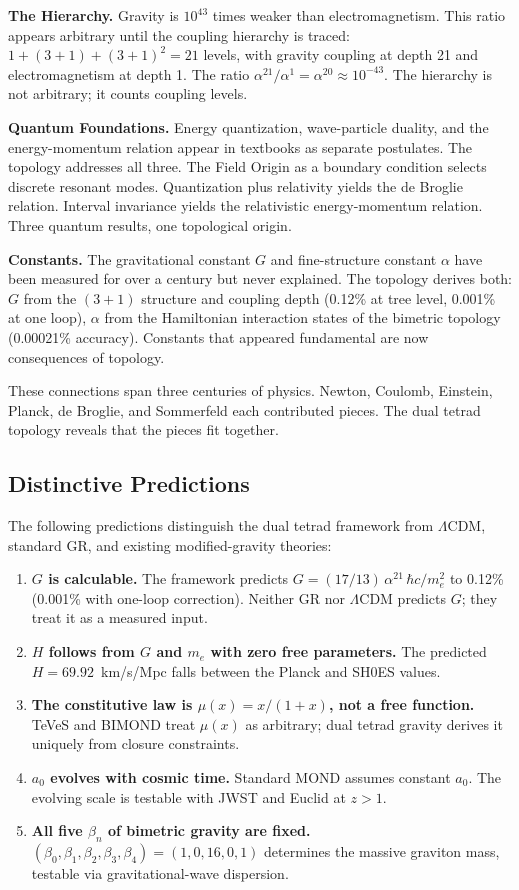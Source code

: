 \documentclass[aps,prd,preprint,superscriptaddress,showpacs,preprintnumbers,amsmath,amssymb,nofootinbib]{revtex4-2}
\begin{document}
\textbf{The Hierarchy.} Gravity is $10^{43}$ times weaker than electromagnetism. This ratio appears arbitrary until the coupling hierarchy is traced: $1 + (3+1) + (3+1)^2 = 21$ levels, with gravity coupling at depth 21 and electromagnetism at depth 1. The ratio $\alpha^{21}/\alpha^{1} = \alpha^{20} \approx 10^{-43}$. The hierarchy is not arbitrary; it counts coupling levels.

\textbf{Quantum Foundations.} Energy quantization, wave-particle duality, and the energy-momentum relation appear in textbooks as separate postulates. The topology addresses all three. The Field Origin as a boundary condition selects discrete resonant modes. Quantization plus relativity yields the de Broglie relation. Interval invariance yields the relativistic energy-momentum relation. Three quantum results, one topological origin.

\textbf{Constants.} The gravitational constant $G$ and fine-structure constant $\alpha$ have been measured for over a century but never explained. The topology derives both: $G$ from the $(3+1)$ structure and coupling depth (0.12\% at tree level, 0.001\% at one loop), $\alpha$ from the Hamiltonian interaction states of the bimetric topology (0.00021\% accuracy). Constants that appeared fundamental are now consequences of topology.

These connections span three centuries of physics. Newton, Coulomb, Einstein, Planck, de Broglie, and Sommerfeld each contributed pieces. The dual tetrad topology reveals that the pieces fit together.

\subsection{Distinctive Predictions}
\label{subsec:predictions}

The following predictions distinguish the dual tetrad framework from $\Lambda$CDM, standard GR, and existing modified-gravity theories:
\begin{enumerate}[leftmargin=2em]
\item \textbf{$G$ is calculable.} The framework predicts $G = (17/13)\,\alpha^{21}\,\hbar c/m_e^2$ to 0.12\% (0.001\% with one-loop correction). Neither GR nor $\Lambda$CDM predicts $G$; they treat it as a measured input.
\item \textbf{$H$ follows from $G$ and $m_e$ with zero free parameters.} The predicted $H = 69.92$~km/s/Mpc falls between the Planck and SH0ES values.
\item \textbf{The constitutive law is $\mu(x) = x/(1+x)$, not a free function.} TeVeS and BIMOND treat $\mu(x)$ as arbitrary; dual tetrad gravity derives it uniquely from closure constraints.
\item \textbf{$a_0$ evolves with cosmic time.} Standard MOND assumes constant $a_0$. The evolving scale is testable with JWST and Euclid at $z > 1$.
\item \textbf{All five $\beta_n$ of bimetric gravity are fixed.} $(\beta_0,\beta_1,\beta_2,\beta_3,\beta_4) = (1,0,16,0,1)$ determines the massive graviton mass, testable via gravitational-wave dispersion.
\end{enumerate}
\end{document}

